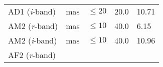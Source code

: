 \documentclass[DM,toc]{lsstdoc}
\begin{document}
\begin{longtable}[]{@{}lllll@{}}
\begin{minipage}[t]{0.19\columnwidth}
AD1 (\emph{i}-band)\strut
\end{minipage} & \begin{minipage}[t]{0.08\columnwidth}\raggedright\strut
mas\strut
\end{minipage} & \begin{minipage}[t]{0.20\columnwidth}\raggedright\strut
\(\leq 20\)\strut
\end{minipage} & \begin{minipage}[t]{0.22\columnwidth}\raggedright\strut
20.0\strut
\end{minipage} & \begin{minipage}[t]{0.17\columnwidth}\raggedright\strut
10.71\strut
\end{minipage}\tabularnewline
\begin{minipage}[t]{0.19\columnwidth}\raggedright\strut
AM2 (\emph{r}-band)\strut
\end{minipage} & \begin{minipage}[t]{0.08\columnwidth}\raggedright\strut
mas\strut
\end{minipage} & \begin{minipage}[t]{0.20\columnwidth}\raggedright\strut
\(\leq 10\)\strut
\end{minipage} & \begin{minipage}[t]{0.22\columnwidth}\raggedright\strut
40.0\strut
\end{minipage} & \begin{minipage}[t]{0.17\columnwidth}\raggedright\strut
6.15\strut
\end{minipage}\tabularnewline
\begin{minipage}[t]{0.19\columnwidth}\raggedright\strut
AM2 (\emph{i}-band)\strut
\end{minipage} & \begin{minipage}[t]{0.08\columnwidth}\raggedright\strut
mas\strut
\end{minipage} & \begin{minipage}[t]{0.20\columnwidth}\raggedright\strut
\(\leq 10\)\strut
\end{minipage} & \begin{minipage}[t]{0.22\columnwidth}\raggedright\strut
40.0\strut
\end{minipage} & \begin{minipage}[t]{0.17\columnwidth}\raggedright\strut
10.96\strut
\end{minipage}\tabularnewline
\begin{minipage}[t]{0.19\columnwidth}\raggedright\strut
AF2 (\emph{r}-band)\strut
\end{minipage} & \begin{minipage}[t]{0.08\columnwidth}\raggedright\strut

\end{minipage}
\end{longtable}
\end{document}
